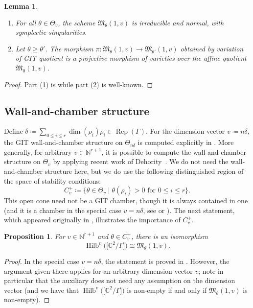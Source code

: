 \documentclass[10pt,a4paper]{amsart}
\newtheorem{Lemma}[Theorem]{Lemma}
\newtheorem{Proposition}[Theorem]{Proposition}
 { \theoremstyle{definition}
\newtheorem{Definition}[Theorem]{Definition}
\newtheorem{Example}[Theorem]{Example}
\newtheorem{Remark}[Theorem]{Remark}
\newtheorem{remarks}[theorem]{Remarks}
}
\newcommand{\SC}{\mathbb{C}} %
\newcommand{\Rep}{\operatorname{Rep}}
\DeclareMathOperator{\Hilb}{\mathrm{Hilb}}
\numberwithin{equation}{section}
\begin{document}
\begin{Lemma}\label{lem:quiver}\quad
\begin{enumerate}\itemsep=0pt
\item[$1.$] For all $\theta \in \Theta_v$, the scheme $\mathfrak{M}_{\theta}(1,v)$ is irreducible and normal, with symplectic singularities.
\item[$2.$] Let $ \theta \geq \theta'$. The morphism $\pi\colon \mathfrak{M}_{\theta}(1,v) \to \mathfrak{M}_{\theta'}(1,v)$ obtained by variation of GIT quotient is a projective morphism of varieties over the affine quotient $\mathfrak{M}_{0}(1,v)$.
\end{enumerate}
\end{Lemma}

\begin{proof}
Part (1) is \cite[Theorem 1.2, Proposition 3.21]{bellamy2016symplectic} while part (2) is well-known.
\end{proof}

\subsection{Wall-and-chamber structure}
\label{subsec:wallandcham}

Define $\delta\coloneqq \sum_{0\leq i\leq r} \dim(\rho_i)\rho_i\in \Rep(\Gamma)$. For the dimension vector $v\coloneqq n\delta$, the GIT wall-and-chamber structure on $\Theta_{n\delta}$ is computed explicitly in \cite[Theorem 4.6]{bellamy2020birational}. More generally, for arbitrary $v \in \mathbb{N}^{r+1}$,
it is possible to compute the wall-and-chamber structure on $\Theta_v$ by applying recent work of
Dehority~\cite[Proposition 4.8]{dehority2020affinizations}. We do not need the wall-and-chamber structure here, but we do use the following distinguished region of the space of stability conditions:
\[ C^{+}_v\coloneqq \{\theta \in \Theta_v \mid \theta(\rho_i) > 0 \textrm{ for } 0 \leq i \leq r \}. \]
This open cone need not be a GIT chamber, though it is always contained in one (and it is a chamber in the special case $v=n\delta$, see \cite[Example~2.1]{bellamy2020birational} or \cite[Section~2.8]{nakajima2009quiver}).
The next statement, which appeared originally in \cite[Section~2]{nakajima2002geometric}, illustrates the importance of $C^{+}_v$.
\begin{Proposition}
\label{prop:hilbiso}
For $v \in \mathbb{N}^{r+1}$ and $\theta \in C^{+}_v$, there is an isomorphism
\[ \Hilb^{v}\big(\big[\SC^2/\Gamma\big]\big) \cong \mathfrak{M}_{\theta}(1,v). \]
\end{Proposition}
\begin{proof}
In the special case $v=n\delta$,
the statement is proved in \cite[Theorem 4.6]{kuznetsov2007quiver}. However, the argument given there applies for
an arbitrary dimension vector $v$; note in particular that the auxiliary \cite[Corollary 3.5]{kuznetsov2007quiver}
does not need any assumption on the dimension vector (and we have that $\Hilb^{v}\big(\big[\SC^2/\Gamma\big]\big)$ is non-empty if and only if $\mathfrak{M}_{\theta}(1,v)$ is non-empty).
\end{proof}
\end{document}
